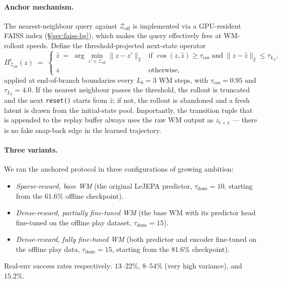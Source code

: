 \paragraph{Anchor mechanism.} The nearest-neighbour query against $\mathcal{Z}_{\text{off}}$ is implemented via a GPU-resident FAISS index (\S\ref{sec:faiss-bg}), which makes the query effectively free at WM-rollout speeds. Define the threshold-projected next-state operator
\begin{equation}
    \Pi^{\epsilon}_{\mathcal{Z}_{\text{off}}}(z) \;=\;
    \begin{cases}
        \hat z \;=\; \arg\min_{z' \in \mathcal{Z}_{\text{off}}} \|z - z'\|_2 &
        \text{if } \cos(z, \hat z) \ge \tau_{\cos}\;\text{and}\;\|z - \hat z\|_2 \le \tau_{L_2},\\[4pt]
        z & \text{otherwise,}
    \end{cases}
    \label{eq:oo-anchor-proj}
\end{equation}
applied at end-of-branch boundaries every $L_b = 3$ WM steps, with $\tau_{\cos} = 0.95$ and $\tau_{L_2} = 4.0$. If the nearest neighbour passes the threshold, the rollout is truncated and the next \texttt{reset()} starts from $\hat z$; if not, the rollout is abandoned and a fresh latent is drawn from the initial-state pool. Importantly, the transition tuple that is appended to the replay buffer always uses the raw WM output as $z_{t+1}$ --- there is no fake snap-back edge in the learned trajectory.

\paragraph{Three variants.} We ran the anchored protocol in three configurations of growing ambition:
\begin{itemize}
    \item \emph{Sparse-reward, base WM} (the original LeJEPA predictor, $\tau_{\text{done}} = 10$, starting from the $61.6\%$ offline checkpoint).
    \item \emph{Dense-reward, partially fine-tuned WM} (the base WM with its predictor head fine-tuned on the offline play dataset, $\tau_{\text{done}} = 15$).
    \item \emph{Dense-reward, fully fine-tuned WM} (both predictor and encoder fine-tuned on the offline play data, $\tau_{\text{done}} = 15$, starting from the $81.6\%$ checkpoint).
\end{itemize}
Real-env success rates respectively: $13$--$22\%$, $8$--$54\%$ (very high variance), and $15.2\%$.

